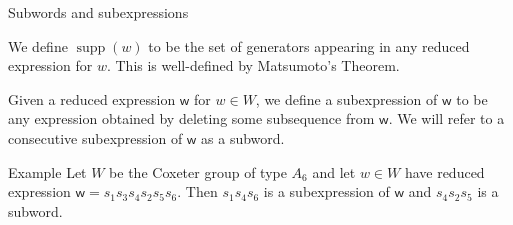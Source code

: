 \documentclass[9pt,handout]{beamer}
\newcommand{\supp}{\operatorname{supp}}
\newcommand{\w}{{\textsf{w}}}
\begin{document}
\begin{frame}{Subwords and subexpressions}
\begin{definition} We define $\supp(w)$ to be the set of generators appearing in any reduced expression for $w$. This is well-defined by Matsumoto's Theorem.
\end{definition}

\begin{definition} Given a reduced expression $\w$ for $w \in W$, we define a \alert{subexpression} of $\w$ to be any expression obtained by deleting some subsequence from $\w$. We will refer to a consecutive subexpression of $\w$ as a \alert{subword}.
\end{definition}
    \pause
\begin{block}{Example} Let $W$ be the Coxeter group of type $A_6$ and let $w \in W$ have reduced expression $\w = s_1s_3s_4s_2s_5s_6$.
    Then $s_1s_4s_6$ is a subexpression of $\w$ and $s_4s_2s_5$ is a subword.
\end{block}
\end{frame}


\end{document}
